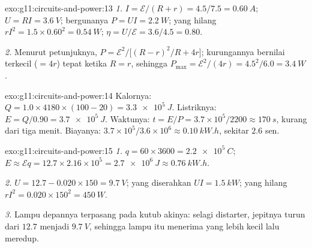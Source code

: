 \begin{solution}{exo:g11:circuits-and-power:13}
\emph{1.} $I = \mathcal{E}/(R + r) = 4.5/7.5 = \qty{0.60}{A}$;
$U = RI = \qty{3.6}{V}$;  bergunanya $P = UI = \qty{2.2}{W}$; yang
hilang $rI^2 =
1.5 \times 0.60^2 = \qty{0.54}{W}$;
$\eta = U/\mathcal{E} = 3.6/4.5 =
0.80$.

\emph{2.} Menurut petunjuknya, $P = \mathcal{E}^2 \big/ \big[(R - r)^2/R +
4r\big]$; kurungannya bernilai terkecil ($= 4r$) tepat ketika
$R = r$, sehingga
$P_{\max} = \mathcal{E}^2/(4r) = 4.5^2/6.0 = \qty{3.4}{W}$.
\end{solution}

\begin{solution}{exo:g11:circuits-and-power:14}
Kalornya: $Q = 1.0 \times 4180 \times (100 - 20) = \qty{3.3e5}{J}$.
Listriknya: $E = Q/0.90 = \qty{3.7e5}{J}$. Waktunya:
$t = E/P =
3.7\times10^{5}/2200 \approx \qty{170}{s}$, kurang dari tiga
menit. Biayanya:
$3.7\times10^{5}/3.6\times10^{6} \approx \qty{0.10}{kW.h}$, sekitar
$2.6$ sen.
\end{solution}

\begin{solution}{exo:g11:circuits-and-power:15}
\emph{1.} $q = 60 \times 3600 = \qty{2.2e5}{C}$;
$E \approx \mathcal{E}q
= 12.7 \times 2.16\times10^{5} = \qty{2.7e6}{J} \approx \qty{0.76}{kW.h}$.

\emph{2.} $U = 12.7 - 0.020 \times 150 = \qty{9.7}{V}$; yang diserahkan
$UI = \qty{1.5}{kW}$; yang hilang
$rI^2 = 0.020 \times 150^2 = \qty{450}{W}$.

\emph{3.} Lampu depannya terpasang pada kutub akinya: selagi distarter,
 jepitnya turun dari $12.7$ menjadi $\qty{9.7}{V}$, sehingga
lampu itu menerima  yang lebih kecil lalu meredup.
\end{solution}


